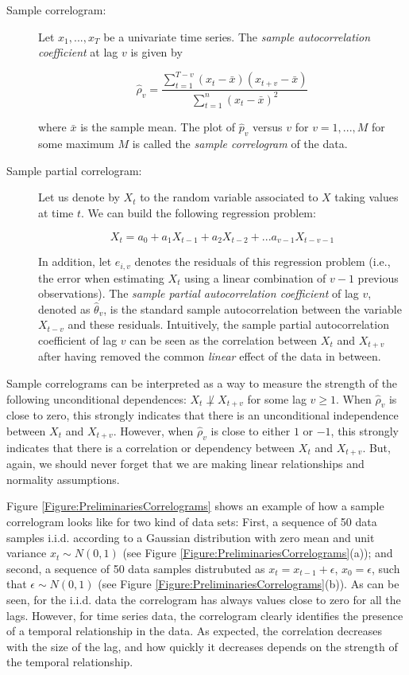 \begin{description}
\item[Sample correlogram:] Let ${x_1,...,x_T}$ be a univariate time series. The \emph{sample autocorrelation coefficient} at lag $v$ is given by 

$$ \hat{\rho}_v =\frac{\sum_{t=1}^{T-v} (x_t-\bar{x})(x_{t+v}-\bar{x})}{\sum_{t=1}^{n} (x_t-\bar{x})^2}$$ 

\noindent where $\bar{x}$ is the sample mean. The plot of $\hat{p}_v$ versus $v$ for $v=1,..., M$ for some maximum $M$ is called the \emph{sample correlogram} of the data.

\item[Sample partial correlogram:] Let us denote by $X_t$ to the random variable associated to $X$ taking values at time $t$. We can build the following regression problem:

$$ X_t = a_0 + a_1X_{t-1} + a_2X_{t-2} + ... a_{v-1}X_{t-v-1}$$

In addition, let $e_{i,v}$ denotes the residuals of this regression problem (i.e., the error when estimating $X_t$ using a linear combination of $v-1$ previous observations). The \emph{sample partial autocorrelation coefficient} of lag $v$, denoted as  $\hat{\theta}_v$, is the standard sample autocorrelation between  the variable $X_{t-v}$ and these residuals. Intuitively, the sample partial autocorrelation coefficient of lag $v$ can be seen as the correlation between $X_t$ and $X_{t+v}$ after having removed the common \emph{linear} effect of the data in between.
\end{description}

Sample correlograms can be interpreted as a way to measure the strength of the following unconditional dependences: $X_t  \not\perp X_{t+v}$ for some lag $v \geq 1$.  When $\hat{\rho}_v$ is close to zero, this strongly indicates that there is an unconditional independence between $X_t$ and $X_{t+v}$. However, when $\hat{\rho}_v$ is close to either $1$ or $-1$, this strongly indicates that there is a correlation or dependency between $X_t$ and $X_{t+v}$. But, again, we should never forget that we are making linear relationships and normality assumptions. 

Figure \ref{Figure:PreliminariesCorrelograms} shows an example of how a sample correlogram looks like for two kind of data sets: First, a sequence of 50 data samples i.i.d. according to a Gaussian distribution with zero mean and unit variance $x_t\sim N(0,1)$ (see Figure \ref{Figure:PreliminariesCorrelograms}(a));  and second, a sequence of 50 data samples distrubuted as $x_t=x_{t-1} + \epsilon$, $x_0=\epsilon$, such that $\epsilon\sim N(0,1)$ (see  Figure \ref{Figure:PreliminariesCorrelograms}(b)). As can be seen, for the i.i.d. data the correlogram has always values close to zero for all the lags. However, for time series data, the correlogram clearly identifies the presence of a temporal relationship in the data. As expected, the correlation decreases with the size of the lag, and how quickly it decreases depends on the strength of the temporal relationship. 

